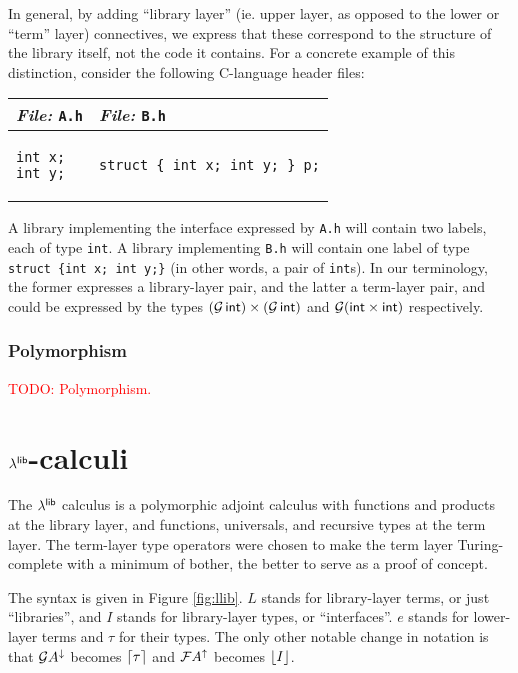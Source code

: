 \documentclass[11pt]{article}
\newcommand{\todo}[1]{\textcolor{red}{\small TODO: #1}}
\begin{document}
In general, by adding ``library layer'' (ie. upper layer, as opposed to the
lower or ``term'' layer) connectives, we express that these correspond to the
structure of the library itself, not the code it contains. For a concrete
example of this distinction, consider the following C-language header files:
\begin{center}
  \begin{tabular}{l|l}
    \emph{File:} \texttt{A.h} & \emph{File:} \texttt{B.h}\\\hline
    \begin{minipage}[t]{0.35\linewidth}
\begin{verbatim}
int x;
int y;
\end{verbatim}
    \end{minipage} &
    \begin{minipage}[t]{0.35\linewidth}
\begin{verbatim}
struct { int x; int y; } p;
\end{verbatim}
    \end{minipage}
  \end{tabular}
\end{center}
A library implementing the interface expressed by \texttt{A.h} will contain two
labels, each of type \texttt{int}. A library implementing \texttt{B.h} will
contain one label of type \texttt{struct \{int x; int y;\}} (in other words, a
pair of \texttt{int}s). In our terminology, the former expresses a library-layer
pair, and the latter a term-layer pair, and could be expressed by the types
$(\mathcal{G}\,\textsf{int}) \times (\mathcal{G}\,\textsf{int})$ and $\mathcal{G}(\textsf{int} \times \textsf{int})$
respectively.

\subsubsection{Polymorphism}

\todo{Polymorphism.}


\section{$\lambda^{\textsf{lib}}$-calculi}

The $\lambda^{\textsf{lib}}$ calculus is a polymorphic adjoint calculus with functions and
products at the library layer, and functions, universals, and recursive types at
the term layer. The term-layer type operators were chosen to make the term layer
Turing-complete with a minimum of bother, the better to serve as a proof of
concept.

The syntax is given in Figure \ref{fig:llib}. $L$ stands for library-layer
terms, or just ``libraries'', and $I$ stands for library-layer types, or
``interfaces''. $e$ stands for lower-layer terms and $\tau$ for their types. The
only other notable change in notation is that $\mathcal{G} A^\downarrow$ becomes
$\lceil{\tau}\rceil$ and $\mathcal{F} A^\uparrow$ becomes $\lfloor{I}\rfloor$.
\end{document}
